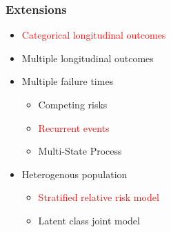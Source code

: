 \documentclass[fleqn]{beamer}
\begin{document}
\begin{frame}
\frametitle{Extensions}
\begin{itemize}
    \item \textcolor{red}{Categorical longitudinal outcomes}
    \item Multiple longitudinal outcomes
    \item Multiple failure times
    \begin{itemize}
        \item Competing risks
        \item \textcolor{red}{Recurrent events}
        \item Multi-State Process
    \end{itemize}
    \item Heterogenous population
    \begin{itemize}
        \item \textcolor{red}{Stratified relative risk model}
        \item Latent class joint model
    \end{itemize}
\end{itemize}   
\end{frame}
\end{document}
